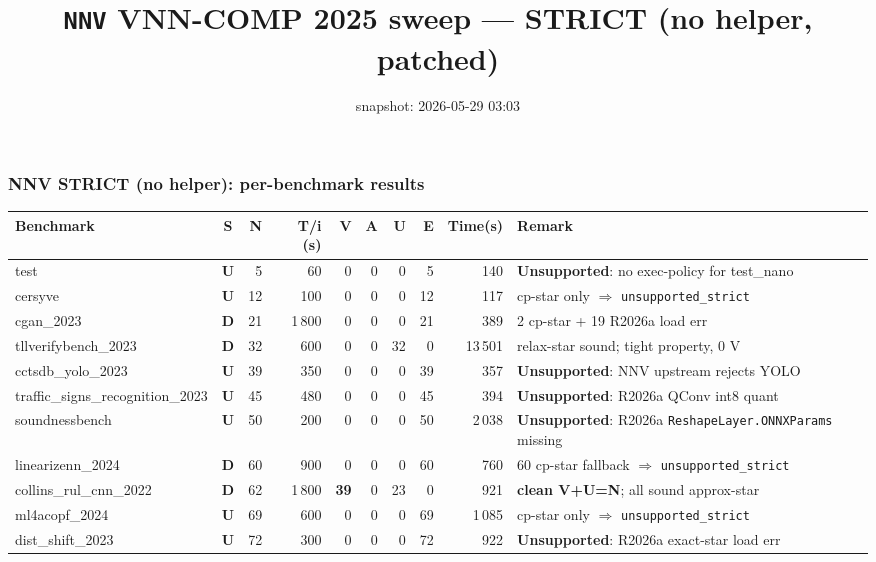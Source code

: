 \documentclass[10pt]{beamer}
\title{\large \texttt{NNV} VNN-COMP 2025 sweep --- STRICT (no helper, patched)}
\date{snapshot: 2026-05-29 03:03}
\newcommand{\sdone}{{\color{cdone}\textbf{D}}}
\newcommand{\sunsup}{{\color{cunsup}\textbf{U}}}
\begin{document}
\begin{frame}[fragile]
\frametitle{NNV STRICT (no helper): per-benchmark results}

\centering\tiny
\setlength{\tabcolsep}{3pt}
\begin{tabular}{l c r r r r r r r l}
\toprule
\textbf{Benchmark} & \textbf{S} & \textbf{N} & \textbf{T/i (s)} & \textbf{V} & \textbf{A} & \textbf{U} & \textbf{E} & \textbf{Time(s)} & \textbf{Remark} \\
\midrule
test                              & \sunsup & 5     & 60      & 0           & 0   & 0     & 5   & 140     & \textbf{Unsupported}: no exec-policy for test\_nano \\
cersyve                           & \sunsup & 12    & 100     & 0           & 0   & 0     & 12  & 117     & cp-star only $\Rightarrow$ \texttt{unsupported\_strict} \\
cgan\_2023                        & \sdone  & 21    & 1\,800  & 0           & 0   & 0     & 21  & 389     & 2 cp-star + 19 R2026a load err \\
tllverifybench\_2023              & \sdone  & 32    & 600     & 0           & 0   & 32    & 0   & 13\,501 & relax-star sound; tight property, 0 V \\
cctsdb\_yolo\_2023                & \sunsup & 39    & 350     & 0           & 0   & 0     & 39  & 357     & \textbf{Unsupported}: NNV upstream rejects YOLO \\
traffic\_signs\_recognition\_2023 & \sunsup & 45    & 480     & 0           & 0   & 0     & 45  & 394     & \textbf{Unsupported}: R2026a QConv int8 quant \\
soundnessbench                    & \sunsup & 50    & 200     & 0           & 0   & 0     & 50  & 2\,038  & \textbf{Unsupported}: R2026a \texttt{ReshapeLayer.ONNXParams} missing \\
linearizenn\_2024                 & \sdone  & 60    & 900     & 0           & 0   & 0     & 60  & 760     & 60 cp-star fallback $\Rightarrow$ \texttt{unsupported\_strict} \\
collins\_rul\_cnn\_2022           & \sdone  & 62    & 1\,800  & \textbf{39} & 0   & 23    & 0   & 921     & \textbf{clean V+U=N}; all sound approx-star \\
ml4acopf\_2024                    & \sunsup & 69    & 600     & 0           & 0   & 0     & 69  & 1\,085  & cp-star only $\Rightarrow$ \texttt{unsupported\_strict} \\
dist\_shift\_2023                 & \sunsup & 72    & 300     & 0           & 0   & 0     & 72  & 922     & \textbf{Unsupported}: R2026a exact-star load err \\

\end{tabular}
\end{frame}
\end{document}
